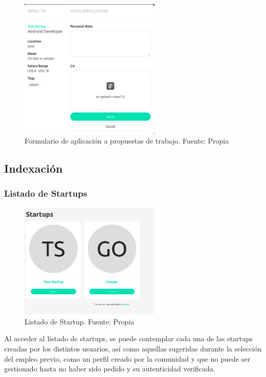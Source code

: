 \begin{figure}[H]
\centering
\includegraphics[width=0.60\textwidth]{img/51.png}
\caption{
Formulario de aplicación a propuestas de trabajo. Fuente: Propia}
\label{figure:jobApplicationForm}
\end{figure}

\subsection{Indexación}

\subsubsection{Listado de Startups}

\begin{figure}[H]
\centering
\includegraphics[width=0.60\textwidth]{img/52.png}
\caption{Listado de Startup. Fuente: Propia}
\label{figure:startupList}
\end{figure}

Al acceder al listado de startups, se puede contemplar cada una de las startups creadas por los distintos usuarios, así como aquellas sugeridas durante la selección del empleo previo, como un perfil creado por la comunidad y que no puede ser gestionado hasta no haber sido pedido y su autenticidad verificada.

